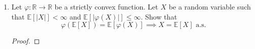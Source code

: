 \documentclass[11pt,letterpaper]{report}
\newcommand{\reals}{\mathbb{R}}
\newcommand{\E}{\mathbb{E}}
\begin{document}
\begin{enumerate}
	\item Let $\varphi:\reals\to \reals$ be a strictly convex function. Let $X$ be a random variable such that $\E[|X|]<\infty$ and $\E[|\varphi(X)|]\leq \infty$. Show that
	\[
	\varphi(\E[X]) = \E[\varphi(X)] \implies X = \E[X]\text{ a.s.}
	\]
	\begin{proof}
		
	\end{proof}
\end{enumerate}
\end{document}
